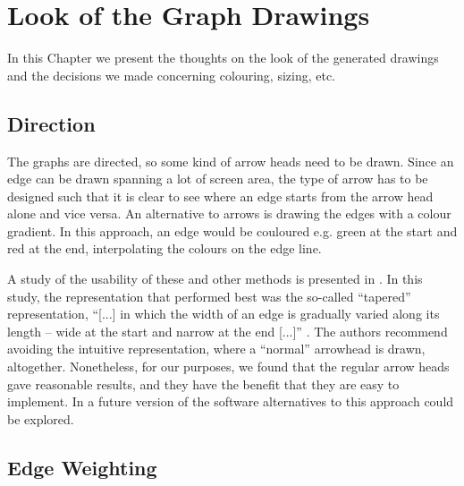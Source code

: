 
\chapter{Look of the Graph Drawings}

In this Chapter we present the thoughts on the look of the generated drawings
and the decisions we made concerning colouring, sizing, etc.

\section{Direction}

The graphs are directed, so some kind of arrow heads need to be drawn. Since
an edge can be drawn spanning a lot of screen area, the type of arrow has to
be designed such that it is clear to see where an edge starts from the arrow
head alone and vice versa. An alternative to arrows is drawing the edges with
a colour gradient. In this approach, an edge would be couloured e.g. green at
the start and red at the end, interpolating the colours on the edge line. 

A study of the usability of these and other methods is presented in
\cite{Holten2009}. In this study, the representation that performed best was
the so-called ``tapered'' representation, ``[...] in which the width of an
edge is gradually varied along its length -- wide at the start and narrow at
the end [...]'' \cite[p. 2307]{Holten2009}. The authors recommend avoiding the
intuitive representation, where a ``normal'' arrowhead is drawn, altogether.
Nonetheless, for our purposes, we found that the regular arrow heads gave
reasonable results, and they have the benefit that they are easy to implement.
In a future version of the software alternatives to this approach could be
explored.

\section{Edge Weighting}


